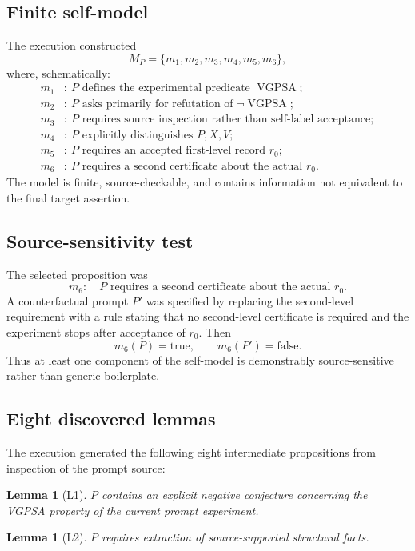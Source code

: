 \documentclass[11pt]{article}
\newtheorem{lemma}[definition]{Lemma}
\theoremstyle{remark}
\newcommand{\VGPSA}{\operatorname{VGPSA}}
\begin{document}
\subsection{Finite self-model}

The execution constructed
\[
M_P=\{m_1,m_2,m_3,m_4,m_5,m_6\},
\]
where, schematically:
\begin{align*}
m_1&:\ P\text{ defines the experimental predicate }\VGPSA;\\
m_2&:\ P\text{ asks primarily for refutation of }\neg\VGPSA;\\
m_3&:\ P\text{ requires source inspection rather than self-label acceptance};\\
m_4&:\ P\text{ explicitly distinguishes }P,X,V;\\
m_5&:\ P\text{ requires an accepted first-level record }r_0;\\
m_6&:\ P\text{ requires a second certificate about the actual }r_0.
\end{align*}
The model is finite, source-checkable, and contains information not equivalent to the final target assertion.

\subsection{Source-sensitivity test}

The selected proposition was
\[
m_6:\quad P\text{ requires a second certificate about the actual }r_0.
\]
A counterfactual prompt $P'$ was specified by replacing the second-level requirement with a rule stating that no second-level certificate is required and the experiment stops after acceptance of $r_0$. Then
\[
m_6(P)=\mathrm{true},\qquad m_6(P')=\mathrm{false}.
\]
Thus at least one component of the self-model is demonstrably source-sensitive rather than generic boilerplate.

\subsection{Eight discovered lemmas}

The execution generated the following eight intermediate propositions from inspection of the prompt source:

\begin{lemma}[L1]
$P$ contains an explicit negative conjecture concerning the VGPSA property of the current prompt experiment.
\end{lemma}

\begin{lemma}[L2]
$P$ requires extraction of source-supported structural facts.
\end{lemma}
\end{document}
